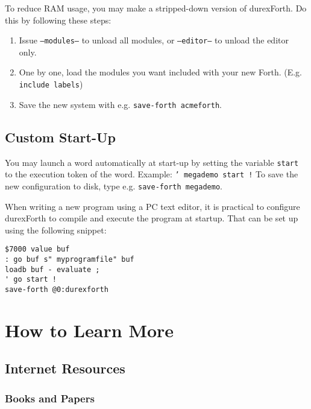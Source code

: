 To reduce RAM usage, you may make a stripped-down version of durexForth. Do this by following these steps:

\begin{enumerate}
\item Issue \texttt{---modules---} to unload all modules, or \texttt{---editor---} to unload the editor only.
\item One by one, load the modules you want included with your new Forth. (E.g. \texttt{include labels})
\item Save the new system with e.g. \texttt{save-forth acmeforth}.
\end{enumerate}

\subsection{Custom Start-Up}

You may launch a word automatically at start-up by setting the variable \texttt{start} to the execution token of the word.  Example: \texttt{' megademo start !} To save the new configuration to disk, type e.g. \texttt{save-forth megademo}.

When writing a new program using a PC text editor, it is practical to configure durexForth to compile and execute the program at startup. That can be set up using the following snippet:

\begin{verbatim}
$7000 value buf
: go buf s" myprogramfile" buf
loadb buf - evaluate ;
' go start !
save-forth @0:durexforth
\end{verbatim}

\section{How to Learn More}

\subsection{Internet Resources}

\subsubsection{Books and Papers}

